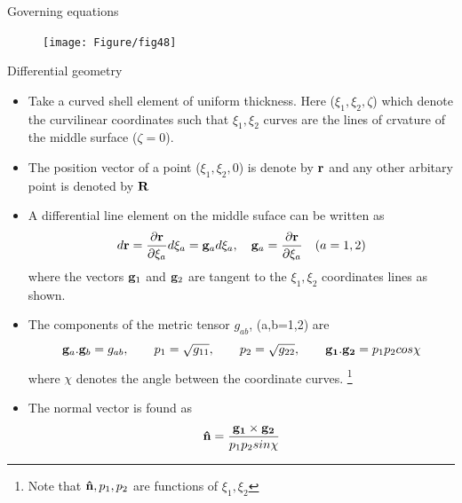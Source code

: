 	\begin{frame}{Governing equations}
		\begin{figure}
			\centering
			\texttt{[image: Figure/fig48]}  		
		\end{figure}
	\end{frame}


	\begin{frame}{Differential geometry}
		\begin{itemize}
			\item Take a curved shell element of uniform thickness. Here ($\xi_1,\xi_2,\zeta$) which denote the curvilinear coordinates such that $\xi_1, \xi_2$ curves are the lines of crvature of the middle surface ($\zeta = 0$). 
			\item The position vector of a point ($\xi_1,\xi_2,0$) is denote by $\mathbf{r}$ and any other arbitary point is denoted by $\mathbf{R}$
			\item A differential line element on the middle suface can be written as 
			\begin{equation}
			d\mathbf{r} = \frac{\partial \mathbf{r}}{\partial \xi_a}d\xi_a = \mathbf{g}_a d\xi_a , \quad \mathbf{g}_a = \frac{\partial \mathbf{r}}{\partial \xi_a} \quad (a =1,2)
			\end{equation}
			where the vectors $\mathbf{g}_1$ and $\mathbf{g}_2$ are tangent to the $\xi_1,\xi_2$ coordinates lines as shown.
			\item  The components of the metric tensor $g_{ab}$, (a,b=1,2) are 
			\begin{equation}
			\mathbf{g}_a.\mathbf{g}_b = g_{ab},  \qquad p_1 = \sqrt{g_{11}}, \qquad p_2 = \sqrt{g_{22}}, \qquad \mathbf{g_1.g_2} = p_1p_2cos \chi
			\end{equation}
			where $\chi$ denotes the angle between the coordinate curves. \footnote{Note that $\mathbf{\hat{n}},p_1,p_2$ are functions of $\xi_1,\xi_2$}
			\item The normal vector is found as
			\begin{equation}
			\mathbf{\hat{n}} = \frac{\mathbf{g_1 \times g_2}}{p_1p_2sin \chi}
			\end{equation}
		\end{itemize}	
	\end{frame}


